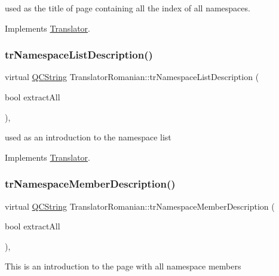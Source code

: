 used as the title of page containing all the index of all namespaces. 

Implements \mbox{\hyperlink{class_translator}{Translator}}.

\mbox{\label{class_translator_romanian_a9f072430d4bfc91f2f9b71834752ced3}} 
\subsubsection{\texorpdfstring{trNamespaceListDescription()}{trNamespaceListDescription()}}
{\footnotesize\ttfamily virtual \mbox{\hyperlink{class_q_c_string}{Q\+C\+String}} Translator\+Romanian\+::tr\+Namespace\+List\+Description (\begin{DoxyParamCaption}\item[{bool}]{extract\+All }\end{DoxyParamCaption})\hspace{0.3cm}{\ttfamily [inline]}, {\ttfamily [virtual]}}

used as an introduction to the namespace list 

Implements \mbox{\hyperlink{class_translator}{Translator}}.

\mbox{\label{class_translator_romanian_aae568feede1237743bc48c05489c43d5}} 
\subsubsection{\texorpdfstring{trNamespaceMemberDescription()}{trNamespaceMemberDescription()}}
{\footnotesize\ttfamily virtual \mbox{\hyperlink{class_q_c_string}{Q\+C\+String}} Translator\+Romanian\+::tr\+Namespace\+Member\+Description (\begin{DoxyParamCaption}\item[{bool}]{extract\+All }\end{DoxyParamCaption})\hspace{0.3cm}{\ttfamily [inline]}, {\ttfamily [virtual]}}

This is an introduction to the page with all namespace members 


